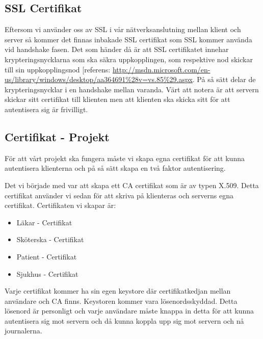 \subsection{SSL Certifikat}
Eftersom vi använder oss av SSL i vår nätverksanslutning mellan klient och server så kommer det finnas inbakade SSL certifikat som SSL kommer använda vid handshake fasen. Det som händer då är att SSL certifikatet innehar krypteringsnycklarna som ska säkra uppkopplingen, som respektive nod skickar till sin uppkopplingsnod [referens: \url{http://msdn.microsoft.com/en-us/library/windows/desktop/aa364691%28v=vs.85%29.aspx}. På så sätt delar de krypteringsnycklar i en handshake mellan varanda. Värt att notera är att servern skickar sitt certifikat till klienten men att klienten ska skicka sitt för att autentisera sig är frivilligt.

\subsection{Certifikat - Projekt}
För att vårt projekt ska fungera måste vi skapa egna certifikat för att kunna autentisera klienterna och på så sätt skapa en två faktor autentisering. 

Det vi började med var att skapa ett CA certifikat som är av typen X.509. Detta certifikat använder vi sedan för att skriva på klienteras och serverns egna certifikat. Certifikaten vi skapar är:

\begin{itemize}
\item{Läkar - Certifikat}
\item{Sköterska - Certifikat}
\item{Patient - Certifikat}
\item{Sjukhus - Certifikat}
\end{itemize}

Varje certifikat kommer ha sin egen keystore där certifikatkedjan mellan användare och CA finns. Keystoren kommer vara lösenordsskyddad. Detta lösenord är personligt och varje användare måste knappa in detta för att kunna autentisera sig mot servern och då kunna koppla upp sig mot servern och nå journalerna. 